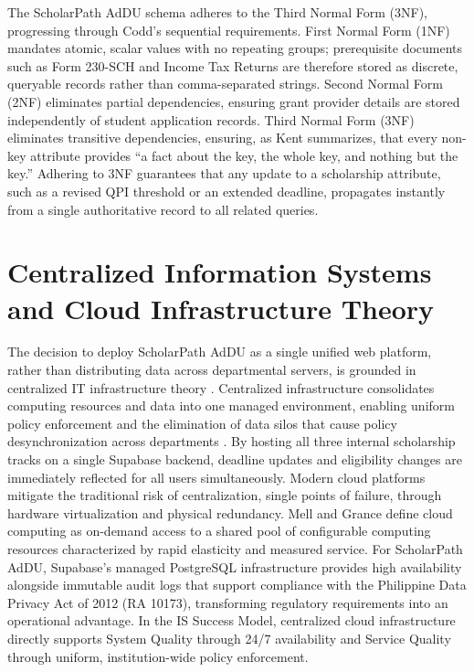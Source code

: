 The ScholarPath AdDU schema adheres to the Third Normal Form (3NF), progressing through Codd's sequential requirements. First Normal Form (1NF) mandates atomic, scalar values with no repeating groups; prerequisite documents such as Form 230-SCH and Income Tax Returns are therefore stored as discrete, queryable records rather than comma-separated strings. Second Normal Form (2NF) eliminates partial dependencies, ensuring grant provider details are stored independently of student application records. Third Normal Form (3NF) eliminates transitive dependencies, ensuring, as Kent \cite{ref32} summarizes, that every non-key attribute provides ``a fact about the key, the whole key, and nothing but the key.'' Adhering to 3NF guarantees that any update to a scholarship attribute, such as a revised QPI threshold or an extended deadline, propagates instantly from a single authoritative record to all related queries.

\section{Centralized Information Systems and Cloud Infrastructure Theory}

The decision to deploy ScholarPath AdDU as a single unified web platform, rather than distributing data across departmental servers, is grounded in centralized IT infrastructure theory \cite{ref34}. Centralized infrastructure consolidates computing resources and data into one managed environment, enabling uniform policy enforcement and the elimination of data silos that cause policy desynchronization across departments \cite{ref41}. By hosting all three internal scholarship tracks on a single Supabase backend, deadline updates and eligibility changes are immediately reflected for all users simultaneously. Modern cloud platforms mitigate the traditional risk of centralization, single points of failure, through hardware virtualization and physical redundancy. Mell and Grance \cite{ref34} define cloud computing as on-demand access to a shared pool of configurable computing resources characterized by rapid elasticity and measured service. For ScholarPath AdDU, Supabase's managed PostgreSQL infrastructure provides high availability alongside immutable audit logs that support compliance with the Philippine Data Privacy Act of 2012 (RA 10173), transforming regulatory requirements into an operational advantage. In the IS Success Model, centralized cloud infrastructure directly supports System Quality through 24/7 availability and Service Quality through uniform, institution-wide policy enforcement.

